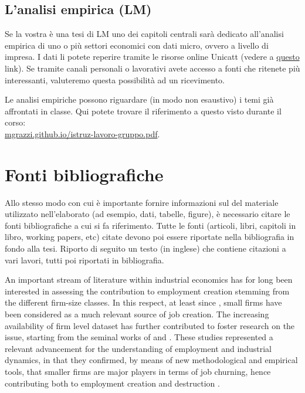 \documentclass[12pt]{article}
\begin{document}
\subsection*{L'analisi empirica (LM)}
Se la vostra \`e una tesi di LM uno dei capitoli centrali sar\`a
dedicato all'analisi empirica di uno o pi\`u settori economici con
dati micro, ovvero a livello di impresa. I dati li potete reperire
tramite le risorse online Unicatt (vedere a
\href{https://biblioteche.unicatt.it/brescia-servizi-per-utenti-interni-ricerche-bibliografiche-e-banche-dati}{questo}
link). Se tramite canali personali o lavorativi avete accesso a fonti
che ritenete pi\`u interessanti, valuteremo questa possibilit\`a ad un
ricevimento. 

Le analisi empiriche possono riguardare (in modo non esaustivo) i temi
gi\`a affrontati in classe. Qui potete trovare il riferimento a questo
visto durante il corso:\\
\href{http://mgrazzi.github.io/istruz-lavoro-gruppo.pdf}{mgrazzi.github.io/istruz-lavoro-gruppo.pdf}.




\section{Fonti bibliografiche}

Allo stesso modo con cui \`e importante fornire informazioni sul del
materiale utilizzato nell'elaborato (ad esempio, dati, tabelle,
figure), \`e necessario citare le fonti bibliografiche a cui si fa
riferimento. Tutte le fonti (articoli, libri, capitoli in libro,
working papers, etc) citate devono poi essere riportate nella
bibliografia in fondo alla tesi. Riporto di seguito un testo (in
inglese) che contiene citazioni a vari lavori, tutti poi riportati in
bibliografia. 

\vspace{0.3cm}

\small{An important stream of literature within industrial
  economics has for long been interested in assessing the contribution
  to employment creation stemming from the different firm-size
  classes. In this respect, at least since \cite{birch_1981}, small
  firms have been considered as a much relevant source of job
  creation. The increasing availability of firm level dataset has
  further contributed to foster research on the issue, starting from
  the seminal works of \cite{davis_haltiwanger_1992} and
  \cite{davis_etal_1996}. These studies represented a relevant
  advancement for the understanding of employment and industrial
  dynamics, in that they confirmed, by means of new methodological and
  empirical tools, that smaller firms are major players in terms of
  job churning, hence contributing both to employment creation and
  destruction \citep[among the others, also refer
  to][]{davis_haltiwanger_1995}.}
\end{document}
